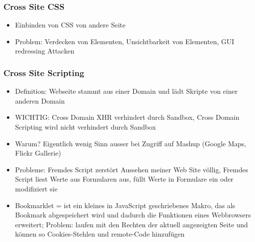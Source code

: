 \documentclass{article} %
\begin{document}
	\subsubsection{Cross Site CSS}
	\begin{itemize}
		\item Einbinden von CSS von andere Seite
		\item Problem: Verdecken von Elementen, Unsichtbarkeit von Elementen, GUI redressing Attacken
	\end{itemize}
	\subsubsection{Cross Site Scripting}
	\begin{itemize}
		\item Definition: Webseite stammt aus einer Domain und lädt Skripte von einer anderen Domain
		\item WICHTIG: Cross Domain XHR verhindert durch Sandbox, Cross Domain Scripting wird nicht verhindert durch Sandbox
		\item Warum? Eigentlich wenig Sinn ausser bei Zugriff auf Mashup (Google Maps, Flickr Gallerie)
		\item Probleme: Fremdes Script zerstört Aussehen meiner Web Site völlig, Fremdes Script liest Werte aus Formularen aus, füllt Werte in Formulare ein oder modifiziert sie

		\item Bookmarklet = ist ein kleines in JavaScript geschriebenes Makro, das als Bookmark abgespeichert wird und dadurch die Funktionen eines Webbrowsers erweitert; Problem: laufen mit den Rechten der aktuell angezeigten Seite und können so Cookies-Stehlen und remote-Code hinzufügen
	\end{itemize}
\end{document}
